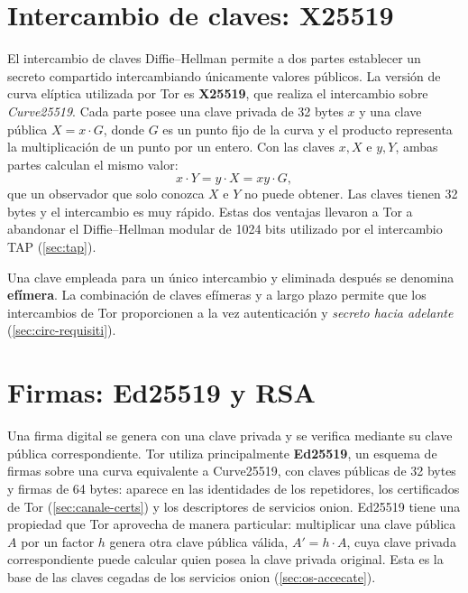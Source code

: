\section{Intercambio de claves: X25519}\label{sec:cripto-dh}

El intercambio de claves Diffie--Hellman permite a dos partes establecer un secreto compartido intercambiando únicamente valores públicos. La versión de curva elíptica utilizada por Tor es \textbf{X25519}, que realiza el intercambio sobre \emph{Curve25519}. Cada parte posee una clave privada de 32 bytes $x$ y una clave pública $X = x \cdot G$, donde $G$ es un punto fijo de la curva y el producto representa la multiplicación de un punto por un entero. Con las claves $x, X$ e $y, Y$, ambas partes calculan el mismo valor:
\[ x \cdot Y = y \cdot X = xy \cdot G, \]
que un observador que solo conozca $X$ e $Y$ no puede obtener. Las claves tienen 32 bytes y el intercambio es muy rápido. Estas dos ventajas llevaron a Tor a abandonar el Diffie--Hellman modular de 1024 bits utilizado por el intercambio TAP (\cref{sec:tap}).

Una clave empleada para un único intercambio y eliminada después se denomina \textbf{efímera}. La combinación de claves efímeras y a largo plazo permite que los intercambios de Tor proporcionen a la vez autenticación y \emph{secreto hacia adelante} (\cref{sec:circ-requisiti}).

\section{Firmas: Ed25519 y RSA}\label{sec:cripto-firme}

Una firma digital se genera con una clave privada y se verifica mediante su clave pública correspondiente. Tor utiliza principalmente \textbf{Ed25519}, un esquema de firmas sobre una curva equivalente a Curve25519, con claves públicas de 32 bytes y firmas de 64 bytes: aparece en las identidades de los repetidores, los certificados de Tor (\cref{sec:canale-certs}) y los descriptores de servicios onion. Ed25519 tiene una propiedad que Tor aprovecha de manera particular: multiplicar una clave pública $A$ por un factor $h$ genera otra clave pública válida, $A' = h \cdot A$, cuya clave privada correspondiente puede calcular quien posea la clave privada original. Esta es la base de las claves cegadas de los servicios onion (\cref{sec:os-accecate}).

